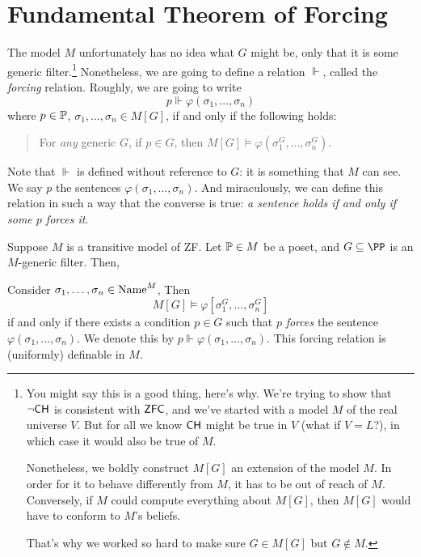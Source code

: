 \section{Fundamental Theorem of Forcing}
The model $M$ unfortunately has no idea what $G$ might be,
only that it is some generic filter.\footnote{%
	You might say this is a good thing, here's why.
	We're trying to show that $\neg \mathsf{CH}$ is consistent with $\mathsf{ZFC}$,
	and we've started with a model $M$ of the real universe $V$.
	But for all we know $\mathsf{CH}$ might be true in $V$ (what if $V=L$?),
	in which case it would also be true of $M$.

	Nonetheless, we boldly construct $M[G]$ an extension of the model $M$.
	In order for it to behave differently from $M$, it has to be out of reach of $M$.
	Conversely, if $M$ could compute everything about $M[G]$,
	then $M[G]$ would have to conform to $M$'s beliefs.

	That's why we worked so hard to make sure $G \in M[G]$ but $G \notin M$.
}
Nonetheless, we are going to define a relation $\Vdash$, called the \emph{forcing} relation.
Roughly, we are going to write
\[ p \Vdash \varphi(\sigma_1, \dots, \sigma_n) \]
where $p \in \mathbb P$, $\sigma_1, \dots, \sigma_n \in M[G]$, if and only if the following holds:
\begin{quote}
	For \emph{any} generic $G$,
	if $p \in G$,
	then $M[G] \vDash \varphi(\sigma_1^G, \dots, \sigma_n^G)$.
\end{quote}
Note that $\Vdash$ is defined without reference to $G$:
it is something that $M$ can see.
We say $p$  the sentences $\varphi(\sigma_1, \dots, \sigma_n)$.
And miraculously, we can define this relation in such a way that the converse is true:
\emph{a sentence holds if and only if some $p$ forces it}.


\begin{theorem}
	Suppose $M$ is a transitive model of ZF.
	Let $\mathbb P \in M$ be a poset, and $G \subseteq \PP$ is an $M$-generic filter.
	Then,
	\begin{enumerate}[(1)]
		\ii Consider $\sigma_1, \dots, \sigma_n \in \text{Name}^M$,
		Then
		\[ M[G] \vDash \varphi[\sigma_1^G, \dots, \sigma_n^G] \]
		if and only if there exists a condition $p \in G$
		such that $p$ \emph{forces} the sentence $\varphi(\sigma_1, \dots, \sigma_n)$.
		We denote this by $p \Vdash \varphi(\sigma_1, \dots, \sigma_n)$.
		\ii This forcing relation is (uniformly) definable in $M$.
	\end{enumerate}
\end{theorem}

